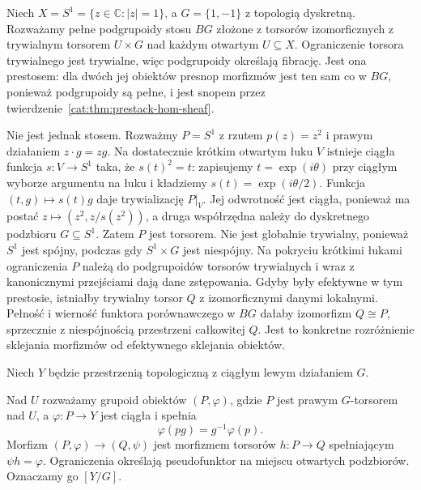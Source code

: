 \begin{przyklad}\label{cat:ex:trivial-torsor-prestack}
Niech $X=S^1=\{z\in\mathbb C:|z|=1\}$, a $G=\{1,-1\}$ z topologią dyskretną. Rozważamy pełne podgrupoidy stosu $BG$ złożone z torsorów izomorficznych z trywialnym torsorem $U\times G$ nad każdym otwartym $U\subseteq X$. Ograniczenie torsora trywialnego jest trywialne, więc podgrupoidy określają fibrację. Jest ona prestosem: dla dwóch jej obiektów presnop morfizmów jest ten sam co w $BG$, ponieważ podgrupoidy są pełne, i jest snopem przez twierdzenie~\ref{cat:thm:prestack-hom-sheaf}.

Nie jest jednak stosem. Rozważmy $P=S^1$ z rzutem $p(z)=z^2$ i prawym działaniem $z\cdot g=zg$. Na dostatecznie krótkim otwartym łuku $V$ istnieje ciągła funkcja $s:V\to S^1$ taka, że $s(t)^2=t$: zapisujemy $t=\exp(i\theta)$ przy ciągłym wyborze argumentu na łuku i kładziemy $s(t)=\exp(i\theta/2)$. Funkcja $(t,g)\mapsto s(t)g$ daje trywializację $P|_V$. Jej odwrotność jest ciągła, ponieważ ma postać $z\mapsto(z^2,z/s(z^2))$, a druga współrzędna należy do dyskretnego podzbioru $G\subseteq S^1$. Zatem $P$ jest torsorem. Nie jest globalnie trywialny, ponieważ $S^1$ jest spójny, podczas gdy $S^1\times G$ jest niespójny. Na pokryciu krótkimi łukami ograniczenia $P$ należą do podgrupoidów torsorów trywialnych i wraz z kanonicznymi przejściami dają dane zstępowania. Gdyby były efektywne w tym prestosie, istniałby trywialny torsor $Q$ z izomorficznymi danymi lokalnymi. Pełność i wierność funktora porównawczego w $BG$ dałaby izomorfizm $Q\cong P$, sprzecznie z niespójnością przestrzeni całkowitej $Q$. Jest to konkretne rozróżnienie sklejania morfizmów od efektywnego sklejania obiektów.
\end{przyklad}

Niech $Y$ będzie przestrzenią topologiczną z ciągłym lewym działaniem $G$. 

\begin{definicja}\label{cat:def:quotient-stack}
Nad $U$ rozważamy grupoid obiektów $(P,\varphi)$, gdzie $P$ jest prawym $G$-torsorem nad $U$, a $\varphi:P\to Y$ jest ciągła i spełnia
\[
 \varphi(pg)=g^{-1}\varphi(p).
\]
Morfizm $(P,\varphi)\to(Q,\psi)$ jest morfizmem torsorów $h:P\to Q$ spełniającym $\psi h=\varphi$. Ograniczenia określają pseudofunktor na miejscu otwartych podzbiorów. Oznaczamy go $[Y/G]$.
\end{definicja}

